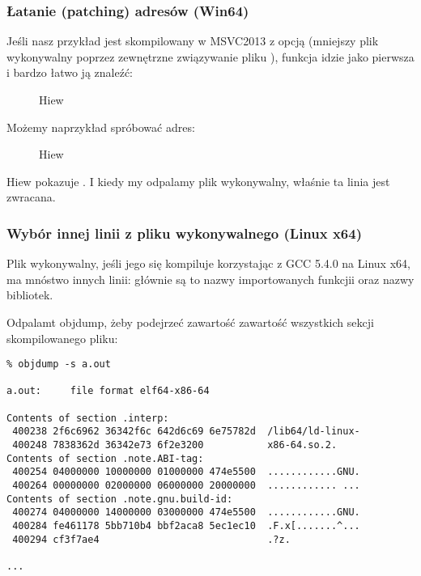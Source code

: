 \subsubsection{Łatanie (patching) adresów (Win64)}

Jeśli nasz przykład jest skompilowany w MSVC2013 z opcją 
(mniejszy plik wykonywalny poprzez zewnętrzne związywanie pliku ),
funkcja \main idzie jako pierwsza i bardzo łatwo ją znaleźć:

\begin{figure}[H]
\centering
{}
\caption{Hiew}
\label{}
\end{figure}

Możemy naprzykład spróbować  adres:

\begin{figure}[H]
\centering
{}
\caption{Hiew}
\label{}
\end{figure}

Hiew pokazuje .
I kiedy my odpalamy plik wykonywalny, właśnie ta linia jest zwracana.

\subsubsection{Wybór innej linii z pliku wykonywalnego (Linux x64)}

Plik wykonywalny, jeśli jego się kompiluje korzystając z GCC 5.4.0 na Linux x64, ma mnóstwo innych linii:
głównie są to nazwy importowanych funkcjii oraz nazwy bibliotek.

Odpalamt objdump, żeby podejrzeć zawartość zawartość wszystkich sekcji skompilowanego pliku:

\begin{lstlisting}
% objdump -s a.out

a.out:     file format elf64-x86-64

Contents of section .interp:
 400238 2f6c6962 36342f6c 642d6c69 6e75782d  /lib64/ld-linux-
 400248 7838362d 36342e73 6f2e3200           x86-64.so.2.
Contents of section .note.ABI-tag:
 400254 04000000 10000000 01000000 474e5500  ............GNU.
 400264 00000000 02000000 06000000 20000000  ............ ...
Contents of section .note.gnu.build-id:
 400274 04000000 14000000 03000000 474e5500  ............GNU.
 400284 fe461178 5bb710b4 bbf2aca8 5ec1ec10  .F.x[.......^...
 400294 cf3f7ae4                             .?z.

...
\end{lstlisting}

